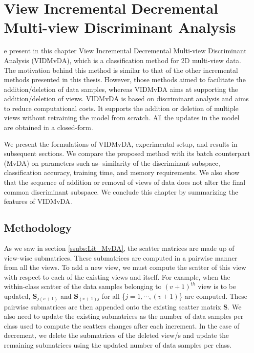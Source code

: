 \chapter{View Incremental Decremental Multi-view Discriminant Analysis}
\label{ch:VIDMvDA}
e present in this chapter View Incremental Decremental Multi-view Discriminant Analysis (VIDMvDA), which is a classification method for 2D multi-view data. The motivation behind this method is similar to that of the other incremental methods presented in this thesis. However, those methods aimed to facilitate the addition/deletion of data samples, whereas VIDMvDA aims at supporting the addition/deletion of views. VIDMvDA is based on discriminant analysis and aims to reduce computational costs. It supports the addition or deletion of multiple views without retraining the model from scratch. All the updates in the model are obtained in a closed-form.

We present the formulations of VIDMvDA, experimental setup, and results in subsequent sections. We compare the proposed method with its batch counterpart (MvDA) on parameters such as- similarity of the discriminant subspace, classification accuracy, training time, and memory requirements. We also show that the sequence of addition or removal of views of data does not alter the final common discriminant subspace. We conclude this chapter by summarizing the features of VIDMvDA.






\section{Methodology}
\label{sec:VIDMvDA_Algo}
As we saw in section \ref{ssubs:Lit_MvDA}, the scatter matrices are made up of view-wise submatrices. These submatrices are computed in a pairwise manner from all the views. To add a new view, we must compute the scatter of this view with respect to each of the existing views and itself. For example, when the within-class scatter of the data samples belonging to $(v+1)^{th}$ view is to be updated, $\textbf{S}_{j(v+1)}$ and $\textbf{S}_{(v+1)j}$ for all \{$j = 1, \cdots, (v+1)$\} are computed. These pairwise submatrices are then appended onto the existing scatter matrix $\textbf{S}$. We also need to update the existing submatrices as the number of data samples per class used to compute the scatters changes after each increment. In the case of decrement, we delete the submatrices of the deleted view/s and update the remaining submatrices using the updated number of data samples per class.

